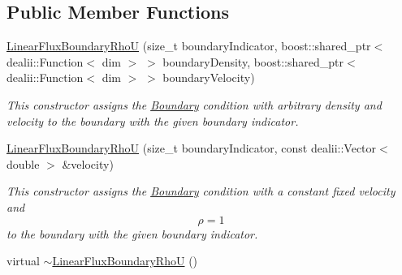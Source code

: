 \subsection*{Public Member Functions}
\begin{DoxyCompactItemize}
\item 
\hyperlink{classnatrium_1_1LinearFluxBoundaryRhoU_a24d71dd4d58a6f1f7468db578e21222e}{LinearFluxBoundaryRhoU} (size\_\-t boundaryIndicator, boost::shared\_\-ptr$<$ dealii::Function$<$ dim $>$ $>$ boundaryDensity, boost::shared\_\-ptr$<$ dealii::Function$<$ dim $>$ $>$ boundaryVelocity)
\begin{DoxyCompactList}\small\item\em This constructor assigns the \hyperlink{classnatrium_1_1Boundary}{Boundary} condition with arbitrary density and velocity to the boundary with the given boundary indicator. \item\end{DoxyCompactList}\item 
\hyperlink{classnatrium_1_1LinearFluxBoundaryRhoU_a6e1fb2da612fc3bfa77dfd61e5f7585e}{LinearFluxBoundaryRhoU} (size\_\-t boundaryIndicator, const dealii::Vector$<$ double $>$ \&velocity)
\begin{DoxyCompactList}\small\item\em This constructor assigns the \hyperlink{classnatrium_1_1Boundary}{Boundary} condition with a constant fixed velocity and \[ \rho = 1 \] to the boundary with the given boundary indicator. \item\end{DoxyCompactList}\item 
\hypertarget{classnatrium_1_1LinearFluxBoundaryRhoU_a8d047c6cce8f30a9dd8717035b57a5a0}{
virtual \hyperlink{classnatrium_1_1LinearFluxBoundaryRhoU_a8d047c6cce8f30a9dd8717035b57a5a0}{$\sim$LinearFluxBoundaryRhoU} ()}
\label{classnatrium_1_1LinearFluxBoundaryRhoU_a8d047c6cce8f30a9dd8717035b57a5a0}


\end{DoxyCompactItemize}
